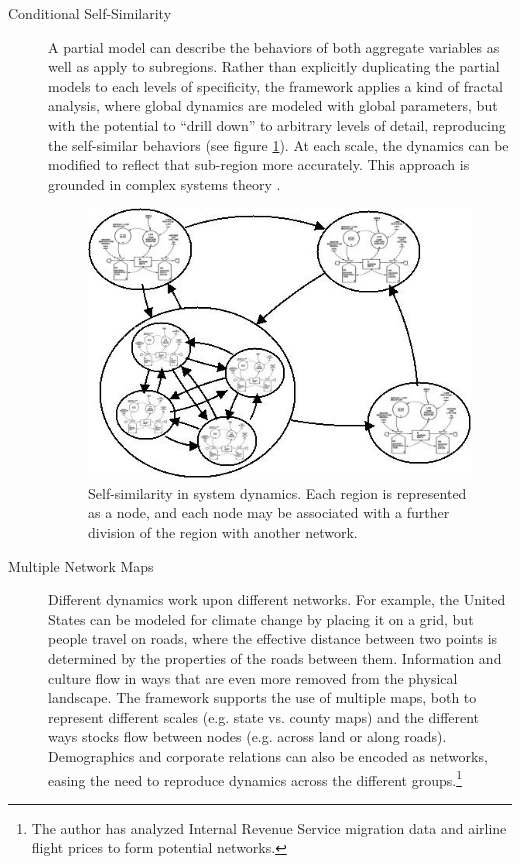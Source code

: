 \documentclass[12pt, oneside]{amsart}
\begin{document}
\begin{description}
\item[Conditional Self-Similarity] A partial model can describe the behaviors of both aggregate variables as well as apply to subregions.  Rather than explicitly duplicating the partial models to each levels of specificity, the framework applies a kind of fractal analysis, where global dynamics are modeled with global parameters, but with the potential to ``drill down'' to arbitrary levels of detail, reproducing the self-similar behaviors (see figure \ref{fig:selfsimodel}).  At each scale, the dynamics can be modified to reflect that sub-region more accurately.  This approach is grounded in complex systems theory \citep{morel1999through}.
\begin{figure}[htb]
\includegraphics[width=4.5in]{selfsimodel.jpeg}
\caption{Self-similarity in system dynamics.  Each region is represented as a node, and each node may be associated with a further division of the region with another network.}
\label{fig:selfsimodel}
\end{figure}

\item[Multiple Network Maps] Different dynamics work upon different networks.  For example, the United States can be modeled for climate change by placing it on a grid, but people travel on roads, where the effective distance between two points is determined by the properties of the roads between them.  Information and culture flow in ways that are even more removed from the physical landscape.  The framework supports the use of multiple maps, both to represent different scales (e.g. state vs. county maps) and the different ways stocks flow between nodes (e.g. across land or along roads).  Demographics and corporate relations can also be encoded as networks, easing the need to reproduce dynamics across the different groups.\footnote{The author has analyzed Internal Revenue Service migration data and airline flight prices to form potential networks.}


\end{description}
\end{document}
